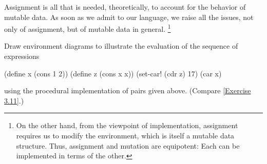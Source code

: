 Assignment is all that is needed, theoretically, to account for the behavior of mutable data.
As soon as we admit  to our language, we raise all the issues, not only of assignment, but of mutable data in general.%
\footnote{
	On the other hand, from the viewpoint of implementation, assignment requires us to modify the environment, which is itself a mutable data structure.
	Thus, assignment and mutation are equipotent:
	Each can be implemented in terms of the other.
}



\begin{exercise}
	\label{Exercise 3.20}
	Draw environment diagrams to illustrate the evaluation of the sequence of expressions
	\begin{scheme}
	  (define x (cons 1 2))
	  (define z (cons x x))
	  (set-car! (cdr z) 17)
	  (car x)
	  ~~
	\end{scheme}
	using the procedural implementation of pairs given above.
	(Compare \cref{Exercise 3.11}.)
\end{exercise}
